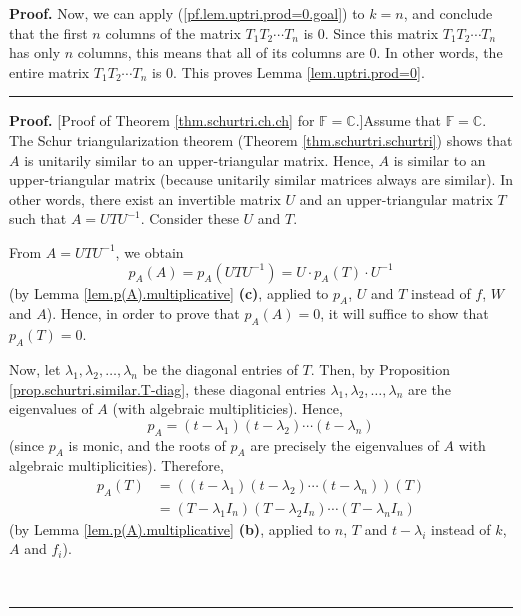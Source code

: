 \documentclass[numbers=enddot,12pt,final,onecolumn,notitlepage]{scrartcl}%
\numberwithin{exer}{subsection}
\theoremstyle{definition}
\newenvironment{proof}[1][Proof]{\noindent\textbf{#1.} }{\ \rule{0.5em}{0.5em}}
\begin{document}
\begin{proof}
Now, we can apply (\ref{pf.lem.uptri.prod=0.goal}) to $k=n$, and conclude that
the first $n$ columns of the matrix $T_{1}T_{2}\cdots T_{n}$ is $0$. Since
this matrix $T_{1}T_{2}\cdots T_{n}$ has only $n$ columns, this means that all
of its columns are $0$. In other words, the entire matrix $T_{1}T_{2}\cdots
T_{n}$ is $0$. This proves Lemma \ref{lem.uptri.prod=0}.
\end{proof}

\begin{proof}
[Proof of Theorem \ref{thm.schurtri.ch.ch} for $\mathbb{F}=\mathbb{C}$.]Assume
that $\mathbb{F}=\mathbb{C}$. The Schur triangularization theorem (Theorem
\ref{thm.schurtri.schurtri}) shows that $A$ is unitarily similar to an
upper-triangular matrix. Hence, $A$ is similar to an upper-triangular matrix
(because unitarily similar matrices always are similar). In other words, there
exist an invertible matrix $U$ and an upper-triangular matrix $T$ such that
$A=UTU^{-1}$. Consider these $U$ and $T$.

From $A=UTU^{-1}$, we obtain
\[
p_{A}\left(  A\right)  =p_{A}\left(  UTU^{-1}\right)  =U\cdot p_{A}\left(
T\right)  \cdot U^{-1}%
\]
(by Lemma \ref{lem.p(A).multiplicative} \textbf{(c)}, applied to $p_{A}$, $U$
and $T$ instead of $f$, $W$ and $A$). Hence, in order to prove that
$p_{A}\left(  A\right)  =0$, it will suffice to show that $p_{A}\left(
T\right)  =0$.

Now, let $\lambda_{1},\lambda_{2},\ldots,\lambda_{n}$ be the diagonal entries
of $T$. Then, by Proposition \ref{prop.schurtri.similar.T-diag}, these
diagonal entries $\lambda_{1},\lambda_{2},\ldots,\lambda_{n}$ are the
eigenvalues of $A$ (with algebraic multipliticies). Hence,%
\[
p_{A}=\left(  t-\lambda_{1}\right)  \left(  t-\lambda_{2}\right)
\cdots\left(  t-\lambda_{n}\right)
\]
(since $p_{A}$ is monic, and the roots of $p_{A}$ are precisely the
eigenvalues of $A$ with algebraic multiplicities). Therefore,%
\begin{align}
p_{A}\left(  T\right)   &  =\left(  \left(  t-\lambda_{1}\right)  \left(
t-\lambda_{2}\right)  \cdots\left(  t-\lambda_{n}\right)  \right)  \left(
T\right) \nonumber\\
&  =\left(  T-\lambda_{1}I_{n}\right)  \left(  T-\lambda_{2}I_{n}\right)
\cdots\left(  T-\lambda_{n}I_{n}\right)
\label{pf.thm.schurtri.ch.ch.F=C.pA(T)=}%
\end{align}
(by Lemma \ref{lem.p(A).multiplicative} \textbf{(b)}, applied to $n$, $T$ and
$t-\lambda_{i}$ instead of $k$, $A$ and $f_{i}$).


\end{proof}
\end{document}

